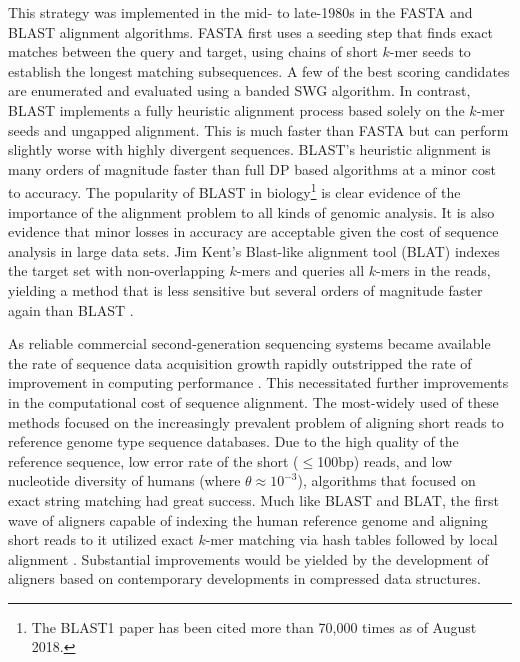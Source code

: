 This strategy was implemented in the mid- to late-1980s in the FASTA \cite{pearson1988improved} and BLAST \cite{altschul1990basic} alignment algorithms.
FASTA first uses a seeding step that finds exact matches between the query and target, using chains of short $k$-mer seeds to establish the longest matching subsequences.
A few of the best scoring candidates are enumerated and evaluated using a banded SWG algorithm.
In contrast, BLAST implements a fully heuristic alignment process based solely on the $k$-mer seeds and ungapped alignment.
This is much faster than FASTA but can perform slightly worse with highly divergent sequences.
BLAST's heuristic alignment is many orders of magnitude faster than full DP based algorithms at a minor cost to accuracy.
The popularity of BLAST in biology\footnote{The BLAST1 paper has been cited more than 70,000 times as of August 2018.} is clear evidence of the importance of the alignment problem to all kinds of genomic analysis.
It is also evidence that minor losses in accuracy are acceptable given the cost of sequence analysis in large data sets.
Jim Kent's Blast-like alignment tool (BLAT) indexes the target set with non-overlapping $k$-mers and queries all $k$-mers in the reads, yielding a method that is less sensitive but several orders of magnitude faster again than BLAST \cite{kent2002blat}.

As reliable commercial second-generation sequencing systems became available the rate of sequence data acquisition growth rapidly outstripped the rate of improvement in computing performance \cite{leinonen2010sequence,kodama2011sequence}.
This necessitated further improvements in the computational cost of sequence alignment.
The most-widely used of these methods focused on the increasingly prevalent problem of aligning short reads to reference genome type sequence databases.
Due to the high quality of the reference sequence, low error rate of the short ($\leq$100bp) reads, and low nucleotide diversity of humans (where $\theta \approx 10^{-3}$), algorithms that focused on exact string matching had great success.
Much like BLAST and BLAT, the first wave of aligners capable of indexing the human reference genome and aligning short reads to it utilized exact $k$-mer matching via hash tables followed by local alignment \cite{li2008soap,lee2014mosaik,li2008mapping}.
Substantial improvements would be yielded by the development of aligners based on contemporary developments in compressed data structures.

